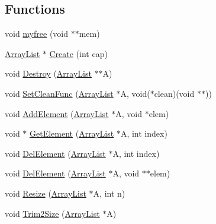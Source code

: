 \subsection*{Functions}
\begin{DoxyCompactItemize}
\item 
void \hyperlink{namespacegft_1_1ArrayList_a1f365e7ad22e93316f13c2ab769b7bc4}{myfree} (void $\ast$$\ast$mem)
\item 
\hyperlink{namespacegft_1_1ArrayList_a597298ec8b05430a184d37236b272878}{Array\-List} $\ast$ \hyperlink{namespacegft_1_1ArrayList_a01d1cba8c4fe374c5b28d1117b82b98c}{Create} (int cap)
\item 
void \hyperlink{namespacegft_1_1ArrayList_a41e34deba44d7bafc9dba0317532248b}{Destroy} (\hyperlink{namespacegft_1_1ArrayList_a597298ec8b05430a184d37236b272878}{Array\-List} $\ast$$\ast$A)
\item 
void \hyperlink{namespacegft_1_1ArrayList_a54b91997deb2620535402b843a41ba0f}{Set\-Clean\-Func} (\hyperlink{namespacegft_1_1ArrayList_a597298ec8b05430a184d37236b272878}{Array\-List} $\ast$A, void($\ast$clean)(void $\ast$$\ast$))
\item 
void \hyperlink{namespacegft_1_1ArrayList_a88f6c6d99a91125b31cf19d4162d8354}{Add\-Element} (\hyperlink{namespacegft_1_1ArrayList_a597298ec8b05430a184d37236b272878}{Array\-List} $\ast$A, void $\ast$elem)
\item 
void $\ast$ \hyperlink{namespacegft_1_1ArrayList_a370eab38f374c054d5316b7bd6bd2239}{Get\-Element} (\hyperlink{namespacegft_1_1ArrayList_a597298ec8b05430a184d37236b272878}{Array\-List} $\ast$A, int index)
\item 
void \hyperlink{namespacegft_1_1ArrayList_ac158f7283708d3ff92eff2c01780c4de}{Del\-Element} (\hyperlink{namespacegft_1_1ArrayList_a597298ec8b05430a184d37236b272878}{Array\-List} $\ast$A, int index)
\item 
void \hyperlink{namespacegft_1_1ArrayList_a3f938b19a2f9491f0a38b92f36b4ce99}{Del\-Element} (\hyperlink{namespacegft_1_1ArrayList_a597298ec8b05430a184d37236b272878}{Array\-List} $\ast$A, void $\ast$$\ast$elem)
\item 
void \hyperlink{namespacegft_1_1ArrayList_a7d19531b65b4aca88afeebac834b24e1}{Resize} (\hyperlink{namespacegft_1_1ArrayList_a597298ec8b05430a184d37236b272878}{Array\-List} $\ast$A, int n)
\item 
void \hyperlink{namespacegft_1_1ArrayList_aeda50c7e6a8a5977b75aa07cdbaabfe1}{Trim2\-Size} (\hyperlink{namespacegft_1_1ArrayList_a597298ec8b05430a184d37236b272878}{Array\-List} $\ast$A)
\end{DoxyCompactItemize}


